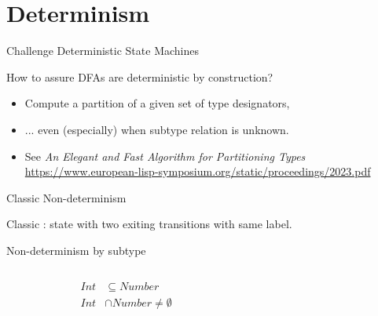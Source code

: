 \section{Determinism}

{  %
\begin{frame}{Challenge }{Deterministic State Machines}

  How to assure DFAs are deterministic by construction?

  \begin{itemize}
  \item   Compute a partition of a given set of type designators,
  \item   ... even (especially) when subtype relation is unknown.
  \item   See \emph{An Elegant and Fast Algorithm for Partitioning Types} \url{https://www.european-lisp-symposium.org/static/proceedings/2023.pdf}
  \end{itemize}

\end{frame}
}


\begin{frame}{Classic Non-determinism}
  \centering
  
  \scalebox{0.95}{}

  Classic : state with two exiting transitions with same label.

\end{frame}

\begin{frame}{Non-determinism by subtype}
  \begin{columns}[T]
    \begin{column}{0.4\textwidth}
      \centering
      
      \begin{align*}
        Int&\subseteq Number\\
        Int &\cap Number \neq \emptyset
      \end{align*}%
      \scalebox{0.8}{}%
    \end{column}%
    \begin{column}{0.6\textwidth}
      \only<1>{\scalebox{0.9}{}}%
      \only<3>{\scalebox{0.8}{}}%
    \end{column}
  \end{columns}
\end{frame}



